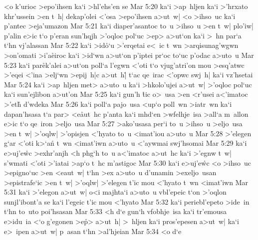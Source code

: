 <o
k'urioc
>epo'ihsen
ka`i
>hl'ehs'en
se\bibvsend
\vs Mar 5:20
ka`i
>ap~hljen
ka`i
>'hrxato
khr'ussein
>en
t~h|
dekap'olei
<'osa
>epo'ihsen
a>ut~w|
<o
>ihso~uc
ka`i
p'antec
>eja'umazon\bibvsend
\vs Mar 5:21
ka`i
diaper'asantoc
to~u
>ihso~u
>en
t~w|
plo'iw|
p'alin
e>ic
t`o
p'eran
sun'hqjh
>'oqloc
pol`uc
>ep>
a>ut`on
ka`i
>~hn
par`a
t`hn
vj'alassan\bibvsend
\vs Mar 5:22
ka`i
>id\r{o}`u
>'erqetai
e<~ic
t~wn
>arqisunag'wgwn
>on'omati
>i'a\r{e}iroc
ka`i
>id`wn
a>ut`on
p'iptei
pr`oc
to`uc
p'odac
a>uto~u\bibvsend
\vs Mar 5:23
ka`i
par\r{e}k'alei
a>ut`on
poll`a
l'egwn
<'oti
t`o
vjug'atri'on
mou
>esq'atwc
>'eqei
<'ina
>elj`wn
>epij~h|c
a>ut~h|\r{}
t`ac
qe~irac
<'opwc
swj~h|
ka`i
vz'hsetai\bibvsend
\vs Mar 5:24
ka`i
>ap~hljen
met>
a>uto~u
ka`i
>hkolo'ujei
a>ut~w|
>'oqloc
pol`uc
ka`i
sun'ejlibon
a>ut'on\bibvsend
\vs Mar 5:25
ka`i
gun'h
\r{t}ic
o>~usa
>en
<r'usei
a<'imatoc
>'eth\r{}
d'wdeka\bibvsend
\vs Mar 5:26
ka`i
poll`a
pajo~usa
<up`o
poll~wn
>iatr~wn
ka`i
dapan'hsasa
t`a
par>
<e\r{a}ut~hc
p'anta
ka`i
mhd`en
>wfelhje~isa
>all`a
m~allon
e>ic
t`o
qe~iron
>eljo~usa\bibvsend
\vs Mar 5:27
>ako'usasa
per`i
to~u
>ihso~u
>eljo~usa
>en
t~w|
>'oqlw|
>'opisjen
<'hyato
to~u
<imat'iou
a>uto~u\bibvsend
\vs Mar 5:28
>'elegen
g`ar
<'oti
k>`an\r{}
t~wn
<imat'iwn
a>uto~u
<'aywmai
swj'hsomai\bibvsend
\vs Mar 5:29
ka`i
e>uj'e\r{w}c
>exhr'anjh
<h
phg`h
to~u
a<'imatoc
a>ut~hc
ka`i
>'egnw
t~w|
s'wmati
<'oti
>'iatai
>ap`o
t~hc
m'astigoc\bibvsend
\vs Mar 5:30
ka`i
e>uj'e\r{w}c
<o
>ihso~uc
>epigno`uc
>en
<eaut~w|
t`hn
>ex
a>uto~u
d'unamin
>exeljo~usan
>epistrafe`ic
>en
t~w|
>'oqlw|
>'elegen
t'ic
mou
<'hyato
t~wn
<imat'iwn\bibvsend
\vs Mar 5:31
ka`i
>'elegon
a>ut~w|
o<i
majhta`i
a>uto~u
vbl'epeic
t`on
>'oqlon
sunjl'ibont'a
se
ka`i
l'egeic
t'ic
mou
<'hyato\bibvsend
\vs Mar 5:32
ka`i
periebl'epeto
>ide~in
t`hn
to~uto
poi'hsasan\bibvsend
\vs Mar 5:33
<h
d`e
gun`h
vfobhje~isa
ka`i
tr'emousa
e>idu~ia
<`o
g'egonen
>e\r{p}>
a>ut~h|
>~hljen
ka`i
pros'epesen
a>ut~w|
ka`i
e>~ipen
a>ut~w|
p~asan
t`hn
>al'hjeian\bibvsend
\vs Mar 5:34
<o
d`e
